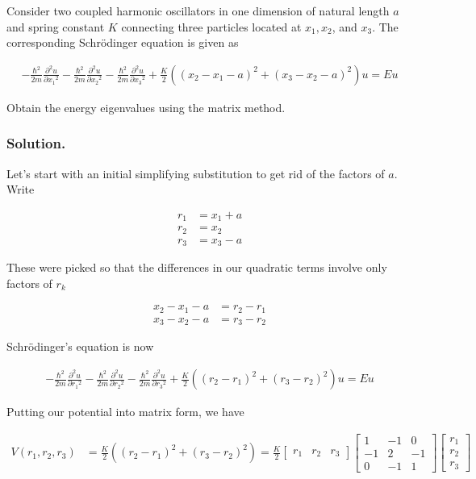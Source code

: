 Consider two coupled harmonic oscillators in one dimension of natural length $a$ and spring constant $K$ connecting three particles located at $x_1, x_2$, and $x_3$.  The corresponding Schr\"{o}dinger equation is given as

\begin{align}\label{eqn:desaiCh9:700}
-\frac{\hbar^2}{2m} \frac{\partial^2 u}{\partial {x_1}^2}
-\frac{\hbar^2}{2m} \frac{\partial^2 u}{\partial {x_2}^2}
-\frac{\hbar^2}{2m} \frac{\partial^2 u}{\partial {x_3}^2}
+ \frac{K}{2}
\left(
(x_2 - x_1 - a)^2
+(x_3 - x_2 - a)^2
\right) u
= E u
\end{align}

Obtain the energy eigenvalues using the matrix method.

\subsubsection{Solution.}

Let's start with an initial simplifying substitution to get rid of the factors of $a$.  Write

\begin{align}\label{eqn:desaiCh9:701}
r_1 &= x_1 + a \\
r_2 &= x_2 \\
r_3 &= x_3 - a
\end{align}

These were picked so that the differences in our quadratic terms involve only factors of $r_k$

\begin{align}\label{eqn:desaiCh9:702}
x_2 - x_1 - a &= r_2 - r_1 \\
x_3 - x_2 - a &= r_3 - r_2
\end{align}

Schr\"{o}dinger's equation is now

\begin{align}\label{eqn:desaiCh9:700a}
-\frac{\hbar^2}{2m} \frac{\partial^2 u}{\partial {r_1}^2}
-\frac{\hbar^2}{2m} \frac{\partial^2 u}{\partial {r_2}^2}
-\frac{\hbar^2}{2m} \frac{\partial^2 u}{\partial {r_3}^2}
+ \frac{K}{2}
\left(
(r_2 - r_1)^2
+(r_3 - r_2)^2
\right) u
= E u
\end{align}

Putting our potential into matrix form, we have

\begin{align}\label{eqn:desaiCh9:703}
V(r_1, r_2, r_3) &=
\frac{K}{2}
\left(
(r_2 - r_1)^2
+(r_3 - r_2)^2
\right)
=
\frac{K}{2}
\begin{bmatrix}
r_1 & r_2 & r_3
\end{bmatrix}
\begin{bmatrix}
1 & -1 & 0 \\
-1 & 2 & -1 \\
0 & -1 & 1
\end{bmatrix}
\begin{bmatrix}
r_1 \\ r_2 \\ r_3
\end{bmatrix}
\end{align}

